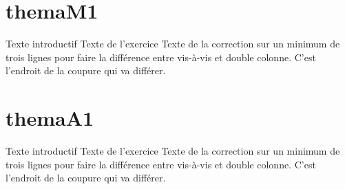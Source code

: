 \documentclass[nocrop]{sesamanuel}
\begin{document}
\themaM
\chapter{themaM1}
\cours  
\begin{methode}
  Texte introductif
  \exercice
  Texte de l’exercice
  \correction
  Texte de la correction sur un minimum de trois lignes pour faire la
  différence entre vis-à-vis et double colonne. C’est l’endroit de la
  coupure qui va différer.
\end{methode}


\themaA
\chapter{themaA1}
\cours  
\begin{methode}
  Texte introductif
  \exercice
  Texte de l’exercice
  \correction
  Texte de la correction sur un minimum de trois lignes pour faire la
  différence entre vis-à-vis et double colonne. C’est l’endroit de la
  coupure qui va différer.
\end{methode}


\AfficheListeMethodes[1]


%
%
\end{document}
